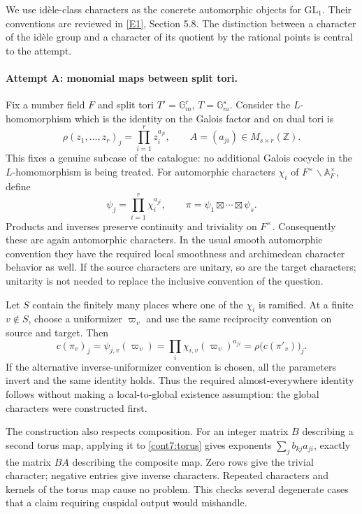 \documentclass[11pt]{article}
\begin{document}
We use id\`ele-class characters as the concrete automorphic objects for
$\mathrm{GL}_1$. Their conventions are reviewed in \href{https://math.mit.edu/~poonen/786/notes.pdf}{[E1]}, Section 5.8.
The distinction between a character of the id\`ele group and a character
of its quotient by the rational points is central to the attempt.

\paragraph{Attempt A: monomial maps between split tori.}
Fix a number field $F$ and split tori
$T'=\mathbb G_m^r$, $T=\mathbb G_m^s$. Consider the $L$-homomorphism
which is the identity on the Galois factor and on dual tori is
\[
 \rho(z_1,\ldots,z_r)_j=\prod_{i=1}^r z_i^{a_{ji}},
 \qquad A=(a_{ji})\in M_{s\times r}(\mathbb Z).
\]
This fixes a genuine subcase of the catalogue: no additional Galois
cocycle in the $L$-homomorphism is being treated. For automorphic
characters $\chi_i$ of $F^\times\backslash\mathbb A_F^\times$, define
\begin{equation}\label{cont7:torus}
 \psi_j=\prod_{i=1}^r\chi_i^{a_{ji}},\qquad
 \pi=\psi_1\boxtimes\cdots\boxtimes\psi_s.
\end{equation}
Products and inverses preserve continuity and triviality on $F^\times$.
Consequently these are again automorphic characters. In the usual
smooth automorphic convention they have the required local smoothness
and archimedean character behavior as well. If the source characters
are unitary, so are the target characters; unitarity is not needed to
replace the inclusive convention of the question.

Let $S$ contain the finitely many places where one of the $\chi_i$ is
ramified. At a finite $v\notin S$, choose a uniformizer $\varpi_v$ and
use the same reciprocity convention on source and target. Then
\[
 c(\pi_v)_j=\psi_{j,v}(\varpi_v)
       =\prod_i\chi_{i,v}(\varpi_v)^{a_{ji}}
       =\rho\bigl(c(\pi'_v)\bigr)_j.
\]
If the alternative inverse-uniformizer convention is chosen, all the
parameters invert and the same identity holds. Thus the required
almost-everywhere identity follows without making a local-to-global
existence assumption: the global characters were constructed first.

The construction also respects composition. For an integer matrix $B$
describing a second torus map, applying it to \eqref{cont7:torus} gives
exponents $\sum_jb_{kj}a_{ji}$, exactly the matrix $BA$ describing the
composite map. Zero rows give the trivial character; negative entries
give inverse characters. Repeated characters and kernels of the torus
map cause no problem. This checks several degenerate cases that a
claim requiring cuspidal output would mishandle.
\end{document}
